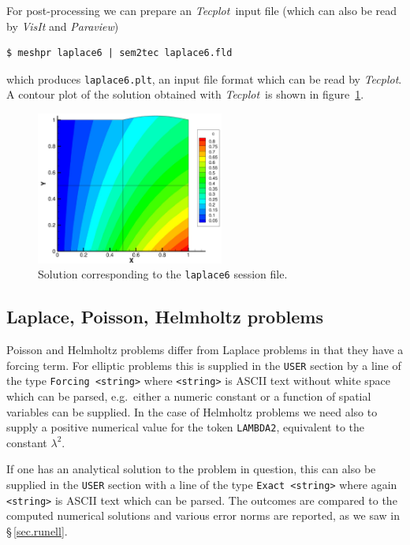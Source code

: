 \documentclass[11pt]{report}
\newcommand{\Tecplot}{\emph{Tecplot}}
\newcommand{\eg}{e.g.\ } \newcommand{\CC}{\mathrm{c.c.}}
\begin{document}
For post-processing we can prepare an \Tecplot\ input file (which can
also be read by \emph{VisIt} and \emph{Paraview})
%
{\small
\begin{verbatim}
$ meshpr laplace6 | sem2tec laplace6.fld
\end{verbatim}
}
%
\noindent
which produces \verb|laplace6.plt|, an input file format which can be
read by \Tecplot.  A contour plot of the solution obtained with
\Tecplot\ is shown in figure~\ref{fig.lapcont}.

\begin{figure}
\begin{center}
\includegraphics[width=0.55\textwidth]{laplace6cont}
\end{center}
\caption{
  Solution corresponding to the \texttt{laplace6} session file.
}
\label{fig.lapcont}
\end{figure}

\subsection{Laplace, Poisson, Helmholtz problems}

Poisson and Helmholtz problems differ from Laplace problems in that
they have a forcing term.  For elliptic problems this is supplied in
the \verb|USER| section by a line of the type \verb|Forcing <string>|
where \verb|<string>| is ASCII text without white space which can be
parsed, \eg either a numeric constant or a function of spatial
variables can be supplied.  In the case of Helmholtz problems we need
also to supply a positive numerical value for the token
\verb|LAMBDA2|, equivalent to the constant $\lambda^2$.

If one has an analytical solution to the problem in question, this can
also be supplied in the \verb|USER| section with a line of the type
\verb|Exact <string>| where again \verb|<string>| is ASCII text which
can be parsed.  The outcomes are compared to the computed numerical
solutions and various error norms are reported, as we saw in
\S\,\ref{sec.runell}.
\end{document}
